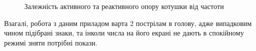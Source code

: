 \begin{figure}[h]
    \begin{minipage}[h]{0.47\linewidth}
         \\
    \end{minipage}
    \hfill
    \begin{minipage}[h]{0.47\linewidth}
        \\
    \end{minipage}
    \caption{Залежність активного та реактивного опору котушки від частоти}
    \label{fig:part23}
\end{figure}

Взагалі, робота з даним приладом варта 2 пострілам в голову, адже випадковим чином підібрані знаки, та інколи числа на його екрані не дають в спокійному режимі зняти потрібні покази.